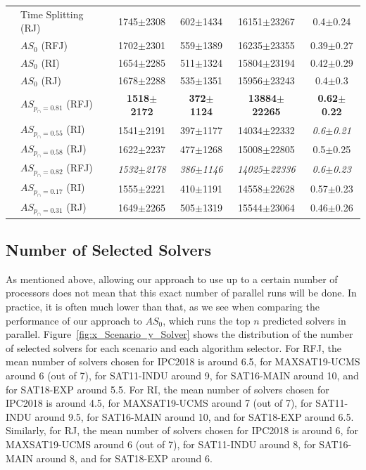 \begin{table}[t]
\begin{center}
\begin{tabular}{clcccc}
         & Time Splitting (RJ) & 1745$\pm$2308  & 602$\pm$1434 & 16151$\pm$23267 & 0.4$\pm$0.24\\
         & $AS_0$ (RFJ) & 1702$\pm$2301 & 559$\pm$1389 & 16235$\pm$23355 & 0.39$\pm$0.27\\
         & $AS_0$ (RI) & 1654$\pm$2285 & 511$\pm$1324 & 15804$\pm$23194 & 0.42$\pm$0.29\\
         & $AS_0$ (RJ) & 1678$\pm$2288 & 535$\pm$1351 & 15956$\pm$23243 & 0.4$\pm$0.3 \\
         & $AS_{p_{\cap} = 0.81}$ (RFJ) & \textbf{1518$\pm$2172} & \textbf{372$\pm$1124} & \textbf{13884$\pm$22265} & \textbf{0.62$\pm$0.22} \\
         & $AS_{p_{\cap} = 0.55}$ (RI) & 1541$\pm$2191 & 397$\pm$1177 & 14034$\pm$22332 & \emph{0.6$\pm$0.21}\\ 
         & $AS_{p_{\cap} = 0.58}$ (RJ) & 1622$\pm$2237 & 477$\pm$1268 & 15008$\pm$22805 & 0.5$\pm$0.25\\
         & $AS_{p_{\cap} = 0.82}$ (RFJ) & \emph{1532$\pm$2178} & \emph{386$\pm$1146} &  \emph{14025$\pm$22336} & \emph{0.6$\pm$0.23}\\
         & $AS_{p_{\cap} = 0.17}$ (RI) & 1555$\pm$2221 & 410$\pm$1191 & 14558$\pm$22628 & 0.57$\pm$0.23\\
         & $AS_{p_{\cap} = 0.31}$ (RJ) & 1649$\pm$2265 & 505$\pm$1319 & 15544$\pm$23064 & 0.46$\pm$0.26\\
    \bottomrule
    \end{tabular}    
\end{center}
\end{table}
\subsection{Number of Selected Solvers}

As mentioned above, allowing our approach to use up to a certain number of processors does not mean that this exact number of parallel runs will be done. In practice, it is often much lower than that, as we see when comparing the performance of our approach to $AS_0$, which runs the top $n$ predicted solvers in parallel. Figure~\ref{fig:x_Scenario_y_Solver} shows the distribution of the number of selected solvers for each scenario and each algorithm selector. For RFJ, the mean number of solvers chosen for IPC2018 is around 6.5, for MAXSAT19-UCMS around 6 (out of 7), for SAT11-INDU around 9, for SAT16-MAIN around 10, and for SAT18-EXP around 5.5. For RI, the mean number of solvers chosen for IPC2018 is around 4.5, for MAXSAT19-UCMS around 7 (out of 7), for SAT11-INDU around 9.5, for SAT16-MAIN around 10, and for SAT18-EXP around 6.5. Similarly, for RJ, the mean number of solvers chosen for IPC2018 is around 6, for MAXSAT19-UCMS around 6 (out of 7), for SAT11-INDU around 8, for SAT16-MAIN around 8, and for SAT18-EXP around 6. 

